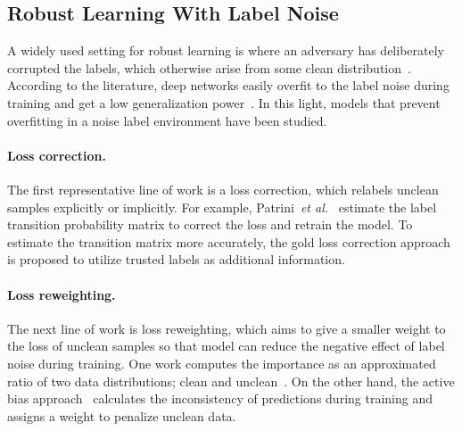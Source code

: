 \documentclass[final]{cvpr}
\newcommand{\cutparagraphup}{\vspace*{-0.15in}}
\begin{document}
\subsection{Robust Learning With Label Noise}
A widely used setting for robust learning is where an adversary has deliberately corrupted the labels, which otherwise arise from some clean
distribution~\cite{natarajan2013learning, song2020learning}. According to the literature, deep networks easily overfit to the label noise during training and get a low generalization power~\cite{liu2020early}. In this light, models that prevent overfitting in a noise label environment have been studied. 
\cutparagraphup
\paragraph{Loss correction.} The first representative line of work is a loss correction, which relabels unclean samples explicitly or implicitly. For example, Patrini~\emph{et al.}~\cite{patrini2017making} estimate the label transition probability matrix to correct the loss and retrain the model. To estimate the transition matrix more accurately, the gold loss correction approach~\cite{hendrycks2018using} is proposed to utilize trusted labels as additional information.
\cutparagraphup
\paragraph{Loss reweighting.} The next line of work is loss reweighting, which aims to give a smaller weight to the loss of unclean samples so that model can reduce the negative effect of label noise during training. One work computes the importance as an approximated ratio of two data distributions; clean and unclean~\cite{wang2017multiclass}. On the other hand, the active bias approach~\cite{chang2017active} calculates the inconsistency of predictions during training and assigns a weight to penalize unclean data. 
\cutparagraphup
\end{document}
